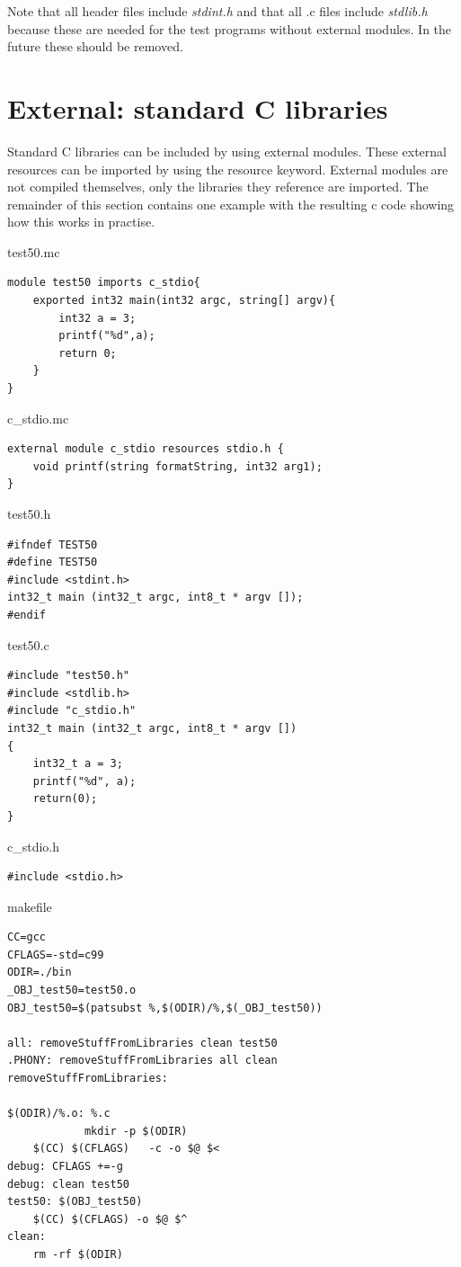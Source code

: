 \documentclass[a4paper,10pt,titlepage]{report}
\begin{document}
Note that all header files include \emph{stdint.h} and that all .c files include \emph{stdlib.h} because these are needed for the test programs without external modules. In the future these should be removed.

\section{External: standard C libraries}
Standard C libraries can be included by using external modules. These external resources can be imported by using the resource keyword. External modules are not compiled themselves, only the libraries they reference are imported. The remainder of this section contains one example with the resulting c code showing how this works in practise.

{\setlength{\parindent}{0cm}

test50.mc
\begin{lstlisting}
module test50 imports c_stdio{
    exported int32 main(int32 argc, string[] argv){
        int32 a = 3;
        printf("%d",a);
        return 0;
    }
}
\end{lstlisting}

c\_stdio.mc
\begin{lstlisting}
external module c_stdio resources stdio.h {
    void printf(string formatString, int32 arg1);
}
\end{lstlisting}

test50.h
\begin{lstlisting}
#ifndef TEST50
#define TEST50
#include <stdint.h>
int32_t main (int32_t argc, int8_t * argv []);
#endif
\end{lstlisting}

test50.c
\begin{lstlisting}
#include "test50.h"
#include <stdlib.h>
#include "c_stdio.h"
int32_t main (int32_t argc, int8_t * argv [])
{
    int32_t a = 3;
    printf("%d", a);
    return(0);
}
\end{lstlisting}

c\_stdio.h
\begin{lstlisting}
#include <stdio.h>
\end{lstlisting}

makefile
\begin{lstlisting}
CC=gcc
CFLAGS=-std=c99
ODIR=./bin
_OBJ_test50=test50.o
OBJ_test50=$(patsubst %,$(ODIR)/%,$(_OBJ_test50))
 
all: removeStuffFromLibraries clean test50
.PHONY: removeStuffFromLibraries all clean
removeStuffFromLibraries:
  	
$(ODIR)/%.o: %.c
        	mkdir -p $(ODIR)
  	$(CC) $(CFLAGS)   -c -o $@ $< 
debug: CFLAGS +=-g
debug: clean test50
test50: $(OBJ_test50)
  	$(CC) $(CFLAGS) -o $@ $^  
clean:
  	rm -rf $(ODIR) 
\end{lstlisting}

}
\end{document}
